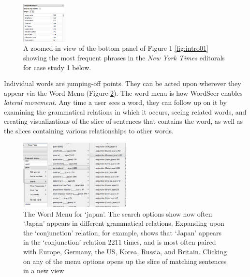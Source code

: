 \documentclass{sig-alternate}
\begin{document}
\begin{figure}[ht!]
\begin{center}
	\includegraphics[width=0.2\textwidth]{fig/intro/07.png}
\end{center}
    \caption{%
        A zoomed-in view of the bottom panel of Figure 1 \ref{fig:intro01} showing the most frequent phrases in the \emph{New York Times} editorals for case study 1 below.  \label{fig:intro07}
     }%
\end{figure}

Individual words are jumping-off points. They can be acted upon wherever they appear via the Word Menu (Figure \ref{fig:intro08}). The word menu is how WordSeer enables \emph{lateral movement}.  Any time a user sees a word, they can follow up on it by examining the grammatical relations in which it occurs, seeing related words,  and creating visualizations of the slice of sentences that contains the word, as well as the slices containing various relationships to other words.

\begin{figure}[ht!]
\begin{center}
	\includegraphics[width=0.5\textwidth]{fig/intro/08.png}
\end{center}
    \caption{%
      The Word Menu for `japan'.  The search options show how often `Japan' appears in different grammatical relations. Expanding upon the `conjunction' relation, for example, shows that `Japan' appears in the  `conjunction' relation  2211 times, and is most often paired with Europe, Germany, the US, Korea, Russia, and Britain. Clicking on any of the menu options opens up the slice of matching sentences in a new view \label{fig:intro08}}%
\end{figure}
\end{document}
